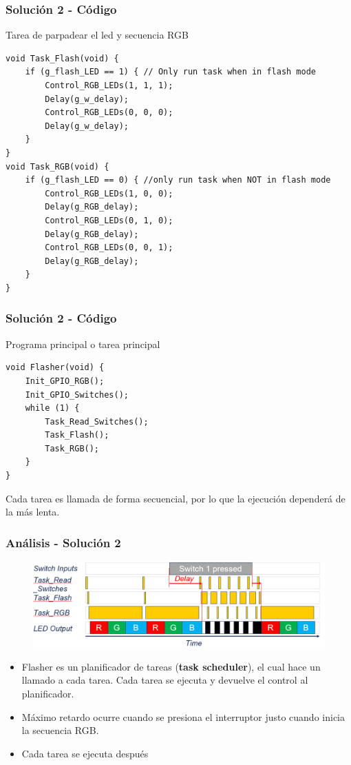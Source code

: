 \documentclass[10.5pt,scale=1.0,t,aspectratio=169,hyperref={pdfpagelabels=false}]{beamer}
\begin{document}
\begin{frame}[fragile]
	\frametitle{Solución 2 - Código}
	
	Tarea de parpadear el led y secuencia RGB
	\begin{lstlisting}[style=CStyle]
void Task_Flash(void) {
	if (g_flash_LED == 1) { // Only run task when in flash mode
		Control_RGB_LEDs(1, 1, 1);
		Delay(g_w_delay);
		Control_RGB_LEDs(0, 0, 0);
		Delay(g_w_delay);
	}
}
void Task_RGB(void) {
	if (g_flash_LED == 0) { //only run task when NOT in flash mode
		Control_RGB_LEDs(1, 0, 0);
		Delay(g_RGB_delay);
		Control_RGB_LEDs(0, 1, 0);
		Delay(g_RGB_delay);
		Control_RGB_LEDs(0, 0, 1);
		Delay(g_RGB_delay);
	}
}
	\end{lstlisting}
\end{frame}
\begin{frame}[fragile]
	\frametitle{Solución 2 - Código}
	
	Programa principal o tarea principal
	\begin{lstlisting}[style=CStyle]
void Flasher(void) {
	Init_GPIO_RGB();
	Init_GPIO_Switches();
	while (1) {
		Task_Read_Switches();
		Task_Flash();
		Task_RGB();
	}
}
	\end{lstlisting}

Cada tarea es llamada de forma secuencial, por lo que la ejecución dependerá de la más lenta. 
\end{frame}
\begin{frame}
	\frametitle{Análisis - Solución 2}
	\begin{figure}
		\centering
		\includegraphics[scale=0.4]{06_TimingSolution2}
	\end{figure}
	\begin{itemize}
		\item Flasher es un planificador de tareas (\textbf{task scheduler}), el cual hace un llamado a cada tarea. Cada tarea se ejecuta y devuelve el control al planificador.
		\item Máximo retardo ocurre cuando se presiona el interruptor justo cuando inicia la secuencia RGB. 
		\item Cada tarea se ejecuta después 
	\end{itemize}
\end{frame}
\end{document}
